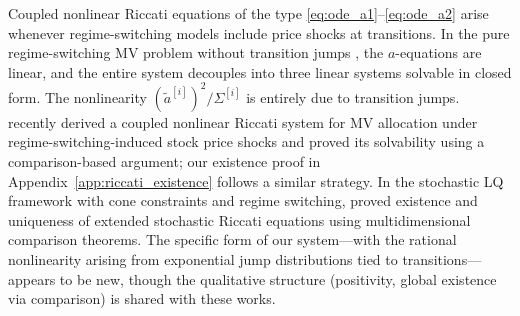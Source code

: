 \documentclass[11pt,a4paper]{article}
\numberwithin{equation}{section}
\begin{document}
Coupled nonlinear Riccati equations of the type \eqref{eq:ode_a1}--\eqref{eq:ode_a2} arise whenever regime-switching models include price shocks at transitions. In the pure regime-switching MV problem without transition jumps \citep{ZhouYin2003}, the $a$-equations are linear, and the entire system decouples into three linear systems solvable in closed form. The nonlinearity $(\tilde{a}^{[i]})^2/\Sigma^{[i]}$ is entirely due to transition jumps. \citet{ShiXu2025} recently derived a coupled nonlinear Riccati system for MV allocation under regime-switching-induced stock price shocks and proved its solvability using a comparison-based argument; our existence proof in Appendix~\ref{app:riccati_existence} follows a similar strategy. In the stochastic LQ framework with cone constraints and regime switching, \citet{HuShiXu2022} proved existence and uniqueness of extended stochastic Riccati equations using multidimensional comparison theorems. The specific form of our system---with the rational nonlinearity arising from exponential jump distributions tied to transitions---appears to be new, though the qualitative structure (positivity, global existence via comparison) is shared with these works.
\end{document}
